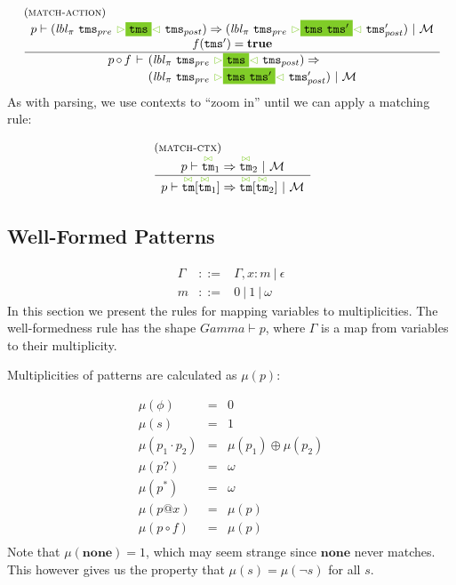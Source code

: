 \documentclass{article}
\makeatletter
\newcommand{\rulename}{\textsc}
\newcommand{\irule}[3]{\begin{array}{l}{~\small\mbox{(\rulename{#1})}}\\\;\frac{\begin{array}{c}#2\end{array}}{\begin{array}{l}#3\end{array}}\end{array}}
\newcommand{\cursorColor}{LimeGreen}
\newcommand{\lbl}{\ensuremath{\mathit{lbl}}}
\newcommand{\tm}{\ensuremath{\mathtt{tm}}}
\newcommand{\tms}{\ensuremath{\mathtt{tms}}}
\newcommand{\Tmc}{\ensuremath{\overset{ \textcolor{\cursorColor}{\bowtie}}{\tm}}}
\newcommand{\mstart}{\ensuremath{\textcolor{\cursorColor}{\rhd}}}
\newcommand{\mend}{\ensuremath{\textcolor{\cursorColor}{\lhd}}}
\newcommand{\bindings}{\ensuremath{\mathcal{M}}}
\newcommand{\select}[1]{\mstart\colorbox{\cursorColor}{$#1$}\mend}
\newcommand{\matches}[4]{\ensuremath{#1 \vdash #2 \Rightarrow #3 ~|~ #4}}
\newcommand{\xmatches}[4]{\ensuremath{
    \begin{array}{r@{\hspace{4pt}}c@{\hspace{4pt}}l}%
      #1 & \vdash & #2 \Rightarrow\\
         &        & #3 ~|~ #4
    \end{array}}}
\newcommand{\wfp}[2]{\ensuremath{#1 \vdash #2}}
\newcommand{\pseq}[2]{\ensuremath{#1 \cdot #2}}
\newcommand{\pnot}[1]{\ensuremath{\lnot #1}}
\newcommand{\maybe}[1]{\ensuremath{#1?}}
\newcommand{\many}[1]{\ensuremath{#1^*}}
\newcommand{\none}{\ensuremath{\mathbf{none}}}
\newcommand{\bind}[2]{\ensuremath{#1@#2}}
\newcommand{\paction}[2]{\ensuremath{#1\mathop{\circ} #2}}
\makeatother
\begin{document}
\[
  \begin{array}{c}
    \irule{match-action}{
    \matches{p}{(\lbl_\pi~\tms_{pre}~\select{\tms}~\tms_{post})}
               {(\lbl_\pi~\tms_{pre}~\select{\tms~\tms'}~\tms'_{post})}{\bindings}\\
    f(\tms') = \mathbf{true}
    }{
    \xmatches{\paction{p}{f}}
    {(\lbl_\pi~\tms_{pre}~\select{\tms}~\tms_{post})}
    {(\lbl_\pi~\tms_{pre}~\select{\tms~\tms'}~\tms'_{post})}{\bindings}
    }
  \end{array}
\]
%
As with parsing, we use contexts to ``zoom in'' until we can apply
a matching rule:

\[
  \begin{array}{c}
    \irule{match-ctx}{
    \matches{p}{\Tmc_1}{\Tmc_2}{\bindings}
    }{
    \matches{p}{\Tmc[\Tmc_1]}{\Tmc[\Tmc_2]}{\bindings}
    }
  \end{array}
\]

\subsection{Well-Formed Patterns}

\[
  \begin{array}{rcl}
    \Gamma & ::= & \Gamma, x : m ~|~ \epsilon\\
    m      & ::= & 0 ~|~ 1 ~|~ \omega
  \end{array}
\]
%
In this section we present the rules for mapping variables to
multiplicities. The well-formedness rule has the shape
$\wfp{Gamma}{p}$, where $\Gamma$ is a map from variables to their
multiplicity.

Multiplicities of patterns are calculated as $\mu(p)$:

\[
  \begin{array}{rcl}
    \mu(\phi)            & = & 0\\
    \mu(s)               & = & 1\\
    \mu(\pseq{p_1}{p_2}) & = & \mu(p_1) \oplus \mu(p_2)\\
    \mu(\maybe{p})       & = & \omega\\
    \mu(\many{p})        & = & \omega\\
    \mu(\bind{p}{x})     & = & \mu(p)\\
    \mu(\paction{p}{f})  & = & \mu(p)\\
  \end{array}
\]
%
Note that $\mu(\none{}) = 1$, which may seem strange since \none{}
never matches. This however gives us the property that
$\mu(s) = \mu(\pnot{s})$ for all $s$.
\end{document}
